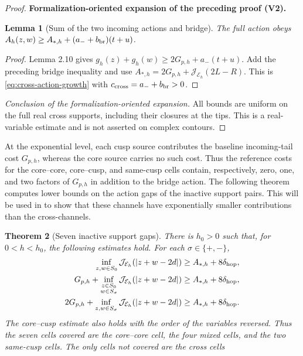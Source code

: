 \documentclass[11pt]{article}
\newtheorem{theorem}{Theorem}[section]
\newtheorem{lemma}[theorem]{Lemma}
\newcommand{\formalisationparentid}{X}
\newenvironment{formalisationaddition}[1]{\par\medskip\begingroup\color{blue}\def\formalisationparentid{#1}\setcounter{formalizationsublemma}{0}\let\lemma\formalizationsublemma\let\endlemma\endformalizationsublemma
  \def\Eo{\mathcal E_h^\circ}\def\EE{\mathcal E_h}\def\phio{\phi_h^\circ}\def\phih{\phi_h}\def\Ho{H_h^{\rm atom}(v^\circ)}\def\Ha{H_h^{\rm atom}}\def\HL{H_h^{L}}\def\Dh{D_h}\def\Log{\operatorname{Log}}\def\ellh{\ell_h}\def\Gp{G_{p,h}}\def\Ast{A_{*,h}}\def\ahat{\widehat{\mathfrak a}_h}\def\ah{\mathfrak a_h}\def\rh{\widehat\rho_h}\def\deltah{\widehat\delta_h}\def\oldref##1{\textup{(##1)}}\def\interface##1{\par\noindent\textit{Analytical interface used here.} ##1\par}\def\finish{\par\noindent\textit{Conclusion of the formalization-oriented expansion.} }\par\noindent\textbf{Formalization-oriented expansion of the preceding proof (V2).}\par\smallskip
}{\par\endgroup\medskip
}
\newcommand{\cE}{\mathcal E}
\newcommand{\cJ}{\mathcal J}
\begin{document}
\begin{proof}
\begin{formalisationaddition}{T5.4}
\begin{lemma}[Sum of the two incoming actions and bridge]\label{sublemma:T5-4-total-action}
The full action obeys $A_h(z,w)\ge A_{*,h}+(a_-+b_{\rm br})(t+u)$.
\end{lemma}
\begin{proof}
Lemma 2.10 gives $g_h(z)+g_h(w)\ge2G_{p,h}+a_-(t+u)$. Add the preceding bridge inequality and use $A_{*,h}=2G_{p,h}+\cJ_{\mathcal E_h}(2L-R)$. This is \eqref{eq:cross-action-growth} with $c_{\rm cross}=a_-+b_{\rm br}>0$.
\end{proof}
\finish All bounds are uniform on the full real cross supports, including their closures at the tips. This is a real-variable estimate and is not asserted on complex contours.
\end{formalisationaddition}

\end{proof}

At the exponential level, each cusp source contributes the baseline incoming-tail
cost $G_{p,h}$, whereas the core source carries no such cost.  Thus the
reference costs for the core--core, core--cusp, and same-cusp cells contain,
respectively, zero, one, and two factors of $G_{p,h}$ in addition to the
bridge action.  The following theorem computes lower bounds on the action
gaps of the inactive support pairs. This will be used in
 to show that these channels have
exponentially smaller contributions than the cross-channels.

\begin{theorem}[Seven inactive support gaps]
\label{thm:support-action-separation}
There is $h_0>0$ such that, for $0<h<h_0$, the following estimates hold.
For each $\sigma\in\{+,-\}$,
\begin{align}
 \inf_{z,w\in S_0}\cJ_{\cE_h}(|z+w-2d|)
 &\ge A_{*,h}+8\delta_{\rm hop},
 \label{eq:core-core-gap}\\
 G_{p,h}+\inf_{\substack{z\in S_0\\w\in S_\sigma}}
 \cJ_{\cE_h}(|z+w-2d|)
 &\ge A_{*,h}+8\delta_{\rm hop},
 \label{eq:core-cusp-gap}\\
 2G_{p,h}+\inf_{z,w\in S_\sigma}
 \cJ_{\cE_h}(|z+w-2d|)
 &\ge A_{*,h}+8\delta_{\rm hop}.
 \label{eq:same-cusp-gap}
\end{align}
The core--cusp estimate also holds with the order of the variables reversed.
Thus the seven cells covered are the core--core cell, the four mixed cells,
and the two same-cusp cells.  The only cells not covered are the cross cells
\end{theorem}
\end{document}
